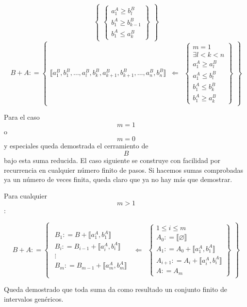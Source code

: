\begin{enumerate}
\[\begin{Bmatrix}
{\begin{Bmatrix}
  {a_{1}^{A} \geq b_{l}^{B}} \\
  {b_{1}^{A} \geq b_{k - 1}^{B}} \\
  {b_{1}^{A} \leq a_{k}^{B}}
  \end{Bmatrix}}
  \end{Bmatrix}\]\[{{B + A}{: =}}\begin{Bmatrix}
  {⟦{{a_{1}^{B},b_{1}^{B}},\ldots,{a_{l}^{B},b_{k}^{B}},{a_{k + 1}^{B},b_{k + 1}^{B}},\ldots,{a_{n}^{B},b_{n}^{B}}}⟧} & \Leftarrow & \begin{Bmatrix}
  {m = 1} \\
  {\exists{{l < k} < n}} \\
  {a_{1}^{A} \geq a_{l}^{B}} \\
  {a_{1}^{A} \leq b_{l}^{B}} \\
  {b_{1}^{A} \leq b_{k}^{B}} \\
  {b_{1}^{A} \geq a_{k}^{B}}
  \end{Bmatrix}
  \end{Bmatrix}\]

  Para el caso \[m = 1\] o \[m = 0\] y especiales queda demostrada el
  cerramiento de \[B\]bajo esta suma reducida. El caso siguiente se
  construye con facilidad por recurrencia en cualquier número finito de
  pasos. Si hacemos sumas comprobadas ya un número de veces finita,
  queda claro que ya no hay más que demostrar.

  Para cualquier \[m > 1\]:

  \[{{B + A}{: =}}\begin{Bmatrix}
  \begin{matrix}
  {B_{1}{: = {B + {⟦{a_{1}^{A},b_{1}^{A}}⟧}}}} \\
  {B_{i}{: = {B_{i - 1} + {⟦{a_{i}^{A},b_{i}^{A}}⟧}}}} \\
   \vdots \\
  {B_{m}{: = {B_{m - 1} + {⟦{a_{m}^{A},b_{m}^{A}}⟧}}}}
  \end{matrix} & {\Leftarrow} & \begin{Bmatrix}
  {{1 \leq i} \leq m} \\
  {A_{0}{: = {⟦\varnothing ⟧}}} \\
  {A_{1}{: = {A_{0} + {⟦{a_{1}^{A},b_{1}^{A}}⟧}}}} \\
  {A_{i + 1}{: = {A_{i} + {⟦{a_{i}^{A},b_{i}^{A}}⟧}}}} \\
  {A{: = A_{m}}}
  \end{Bmatrix}
  \end{Bmatrix}\]

  Queda demostrado que toda suma da como resultado un conjunto finito de
  intervalos gené\-ricos.


\end{enumerate}
